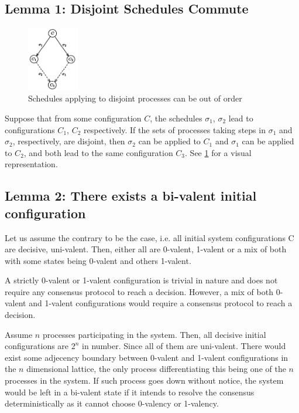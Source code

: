 \subsection{Lemma 1: Disjoint Schedules Commute}
\begin{figure}
    \centering
    \includegraphics[width=0.20\textwidth]{time-synchrony-failures/flp-impossibility/assets/flp-impossibility-lemma1.png}
    \caption{Schedules applying to disjoint processes can be out of order}
    \label{fig:flp-impossibility-lemma1}
\end{figure}
Suppose that from some configuration $C$, the schedules $\sigma_1$, $\sigma_2$ lead to configurations $C_1$, $C_2$ respectively. If the sets of processes taking steps in $\sigma_1$ and $\sigma_2$, respectively, are disjoint, then $\sigma_2$ can be applied to $C_1$ and $\sigma_1$ can be applied to $C_2$, and both lead to the same configuration $C_3$. See \ref{fig:flp-impossibility-lemma1} for a visual representation.

\subsection{Lemma 2: There exists a bi-valent initial configuration}

Let us assume the contrary to be the case, i.e. all initial system configurations C are decisive, uni-valent. Then, either all are 0-valent, 1-valent or a mix of both with some states being 0-valent and others 1-valent.

A strictly 0-valent or 1-valent configuration is trivial in nature and does not require any consensus protocol to reach a decision. However, a mix of both 0-valent and 1-valent configurations would require a consensus protocol to reach a decision.

Assume $n$ processes participating in the system. Then, all decisive initial configurations are $2^n$ in number. Since all of them are uni-valent. There would exist some adjecency boundary between 0-valent and 1-valent configurations in the $n$ dimensional lattice, the only process differentiating this being one of the $n$ processes in the system. If such process goes down without notice, the system would be left in a bi-valent state if it intends to resolve the consensus deterministically as it cannot choose 0-valency or 1-valency.

